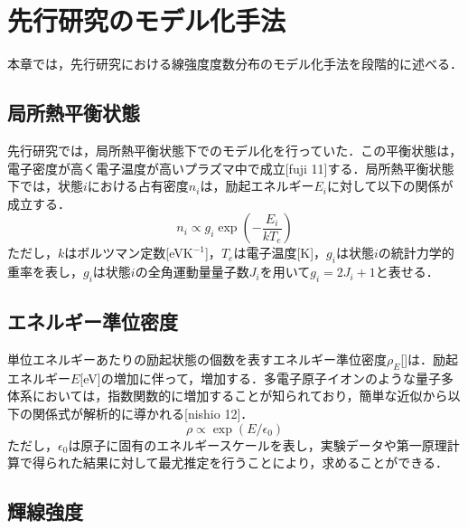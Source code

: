 \chapter{先行研究のモデル化手法}

本章では，先行研究における線強度度数分布のモデル化手法を段階的に述べる．

\section{局所熱平衡状態}
先行研究では，局所熱平衡状態下でのモデル化を行っていた．この平衡状態は，電子密度が高く電子温度が高いプラズマ中で成立[fuji 11]する．局所熱平衡状態下では，状態$i$における占有密度$n_i$は，励起エネルギー$E_i$に対して以下の関係が成立する．\begin{equation}
    \label{popu_LTE}
    n_i \propto g_i\exp(-\frac{E_i}{kT_e})
\end{equation}
ただし，$k$はボルツマン定数[eV$\mathrm{K^{-1}}$]，$T_e$は電子温度[K]，$g_i$は状態$i$の統計力学的重率を表し，$g_i$は状態$i$の全角運動量量子数$J_i$を用いて$g_i = 2J_i + 1$と表せる．

\section{エネルギー準位密度}
単位エネルギーあたりの励起状態の個数を表すエネルギー準位密度$\rho_E$[]は．励起エネルギー$E$[eV]の増加に伴って，増加する．多電子原子イオンのような量子多体系においては，指数関数的に増加することが知られており，簡単な近似から以下の関係式が解析的に導かれる[nishio 12]．
\begin{equation}
    \label{level_density}
    \rho \propto \exp(E/\epsilon_0)
\end{equation}
ただし，$\epsilon_0$は原子に固有のエネルギースケールを表し，実験データや第一原理計算で得られた結果に対して最尤推定を行うことにより，求めることができる．


\section{輝線強度}

















